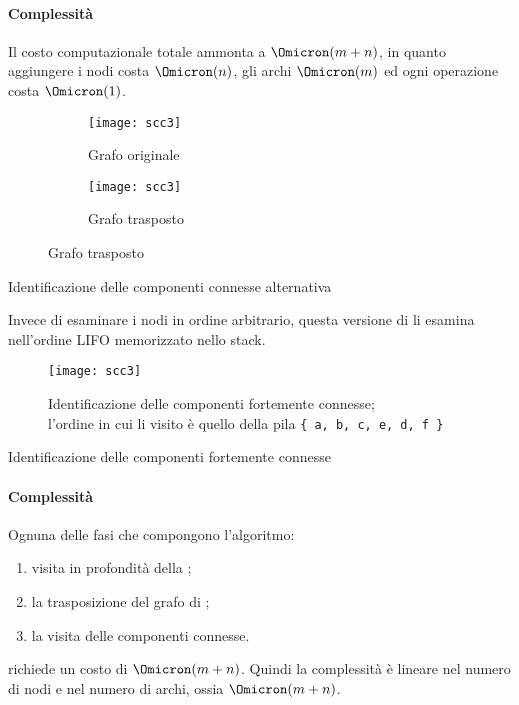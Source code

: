 \clearpage
\paragraph{Complessità}
Il costo computazionale totale ammonta a \(\Omicron(m+n)\), in quanto aggiungere i nodi costa \(\Omicron(n)\), gli archi \(\Omicron(m)\) ed ogni operazione costa \(\Omicron(1)\).

\begin{figure}[H]
	\begin{subfigure}{.5\textwidth}
		\texttt{[image: scc3]}
		\caption{Grafo originale}
	\end{subfigure}\hfill
	\begin{subfigure}{.5\textwidth}
		\texttt{[image: scc3]}
		\caption{Grafo trasposto}
	\end{subfigure}
\end{figure}

\begin{algorithm}[H]
	\caption{Identificazione delle componenti connesse alternativa}
	
	
\end{algorithm}

\vspace{-10pt}
Invece di esaminare i nodi in ordine arbitrario, questa versione di \ConnectedComponents li esamina nell'ordine \textsc{LIFO} memorizzato nello stack.

\begin{figure}[H]\centering
	\texttt{[image: scc3]}
	\caption[Identificazione delle componenti fortemente connesse]{Identificazione delle componenti fortemente connesse;\\l'ordine in cui li visito è quello della pila \texttt{\{ a, b, c, e, d, f \} }}
\end{figure}

\begin{algorithm}[H]
	\caption{Identificazione delle componenti fortemente connesse}
	
\end{algorithm}

\paragraph{Complessità}
Ognuna delle fasi che compongono l'algoritmo:
\begin{enumerate}
	\item visita in profondità della \topSort;
	\item la trasposizione del grafo di \transpose;
	\item la visita delle componenti connesse.
\end{enumerate}
richiede un costo di \(\Omicron(m+n)\).
Quindi la complessità è lineare nel numero di nodi e nel numero di archi, ossia \(\Omicron(m+n)\).


